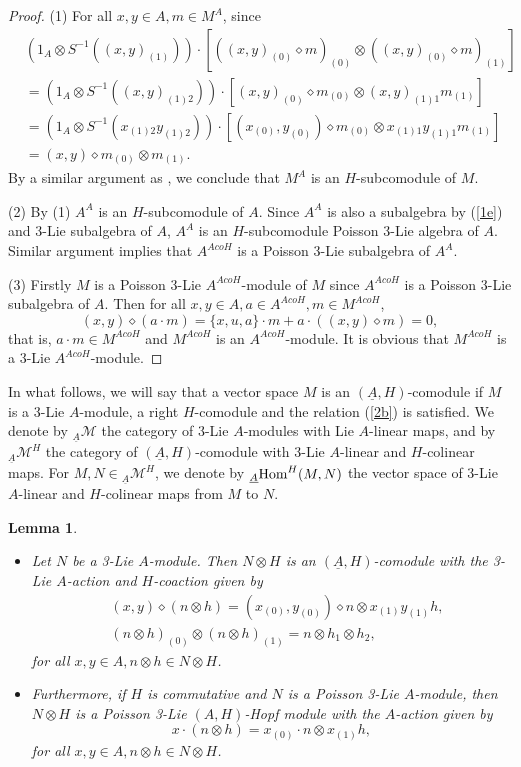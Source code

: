\documentclass[11pt]{article}
\newtheorem{lemma}[theorem]{Lemma}
\def\di{\diamond}
\def\ot{\otimes}
\begin{document}
\begin{proof}
(1) For all $x,y\in A,m\in M^A$, since
\begin{align*}
&(1_A\ot S^{-1}((x,y)_{(1)}))\cdot[((x,y)_{(0)}\di m)_{(0)}\ot((x,y)_{(0)}\di m)_{(1)}]\\
&=(1_A\ot S^{-1}((x,y)_{(1)2}))\cdot[(x,y)_{(0)}\di m_{(0)}\ot (x,y)_{(1)1}m_{(1)}]\\
&=(1_A\ot S^{-1}(x_{(1)2}y_{(1)2}))\cdot[(x_{(0)},y_{(0)})\di m_{(0)}\ot x_{(1)1}y_{(1)1}m_{(1)}]\\
&=(x,y)\di m_{(0)}\ot m_{(1)}.
\end{align*}
By a similar argument as \cite{Gu}, we conclude that $M^A$ is an $H$-subcomodule of $M$.

(2) By (1) $A^A$ is an $H$-subcomodule of $A$. Since $A^A$ is also a subalgebra by (\ref{1e}) and 3-Lie subalgebra of $A$, $A^A$ is an $H$-subcomodule Poisson 3-Lie algebra of $A$. Similar argument implies that $A^{AcoH}$ is a Poisson 3-Lie subalgebra of $A^A$.

(3) Firstly $M$ is a Poisson 3-Lie $A^{AcoH}$-module of $M$ since $A^{AcoH}$ is a Poisson 3-Lie subalgebra of $A$. Then for all $x,y\in A,a\in A^{AcoH},m\in M^{AcoH}$,
$$(x,y)\di(a\cdot m)=\{x,u,a\}\cdot m+a\cdot ((x,y)\di m)=0,$$
that is, $a\cdot m\in M^{AcoH}$ and $M^{AcoH}$ is an $A^{AcoH}$-module. It is obvious that $M^{AcoH}$ is a 3-Lie $A^{AcoH}$-module. 
\end{proof}

In what follows, we will say that a vector space $M$ is an $(\underline{A},H)$-comodule if $M$ is a 3-Lie $A$-module, a right $H$-comodule and the relation (\ref{2b}) is satisfied. We denote by $_{\underline{A}}\mathcal{M}$ the category of 3-Lie $A$-modules with Lie $A$-linear maps, and by $_{\underline{A}}\mathcal{M}^H$ the category of $(\underline{A},H)$-comodule with 3-Lie $A$-linear and $H$-colinear maps. For $M,N\in\! _{\underline{A}}\mathcal{M}^H$, we denote by $_{\underline{A}}\textup{Hom}^H(M,N)$ the vector space of 3-Lie $A$-linear and $H$-colinear maps from $M$ to $N$.

\begin{lemma}\label{lem:2c}
\begin{itemize}
  \item [(1)] Let $N$ be a 3-Lie $A$-module. Then $N\ot H$ is an $(\underline{A},H)$-comodule with the 3-Lie $A$-action and $H$-coaction given by
\begin{align*}
&(x,y)\di (n\ot h)=(x_{(0)},y_{(0)})\di n\ot x_{(1)}y_{(1)}h,\\
&(n\ot h)_{(0)}\ot(n\ot h)_{(1)}=n\ot h_1\ot h_2,
\end{align*}
for all $x,y\in A, n\ot h\in N\ot H$.
  \item [(2)] Furthermore, if $H$ is commutative and $N$ is a Poisson 3-Lie $A$-module, then $N\ot H$ is a Poisson 3-Lie $(A, H)$-Hopf module with the $A$-action given by
$$x\cdot (n\ot h)= x_{(0)}\cdot n\ot x_{(1)}h,$$
for all $x,y\in A, n\ot h\in N\ot H$.
\end{itemize}
\end{lemma}
\end{document}
